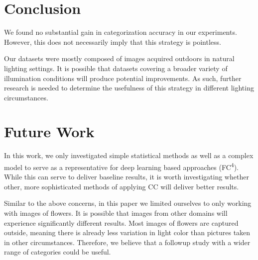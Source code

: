 \section{Conclusion}

We found no substantial gain in categorization accuracy in our experiments.
However, this does not necessarily imply that this strategy is pointless.

Our datasets were mostly composed of images acquired
outdoors in natural lighting settings. It is possible that datasets covering a
broader variety of illumination conditions will produce potential improvements.
As such, further research is needed to determine the usefulness of this strategy in different
lighting circumstances.


\section{Future Work}

In this work, we only investigated simple statistical methods as well as a complex model to serve as a representative
for deep learning based approaches (FC\textsuperscript{4}). While this can serve to deliver baseline results, it is worth investigating
whether other, more sophisticated methods of applying \gls{CC} will deliver better results.

Similar to the above concerns, in this paper we limited ourselves to only working with images of flowers. It is possible that images from
other domains will experience significantly different results. Most images of flowers are captured outside, meaning there is already less variation in
light color than pictures taken in other circumstances. Therefore, we believe that a followup study with a wider range of categories could be useful.
